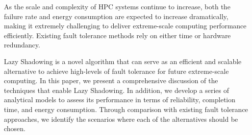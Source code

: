 As the scale and complexity of HPC systems continue to increase, both the failure rate and energy consumption are expected to increase dramatically, making it extremely challenging to deliver extreme-scale computing performance efficiently. Existing fault tolerance methods rely on either time or hardware redundancy. %

Lazy Shadowing is a novel algorithm that can serve as an efficient and scalable alternative to achieve high-levels of fault tolerance for future extreme-scale computing. In this paper, we present a comprehensive discussion of the techniques that enable Lazy Shadowing. In addition, we develop a series of analytical models to assess its performance in terms of reliability, completion time, and energy consumption. 
Through comparison with existing fault tolerance approaches, we identify the scenarios where each of the alternatives should be chosen. %

